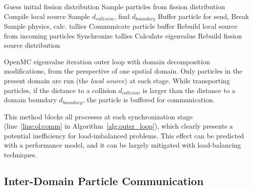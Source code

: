 \documentclass[12pt,twoside]{mitthesis-exec}
\begin{document}
\begin{algorithm}[h!]
    \begin{algorithmic}[1]
        \State Guess initial fission distribution \label{line:ol:guess}
            \State Sample particles from fission distribution
            \State Compile local source \label{line:ol:compile_src}
            \Repeat \label{line:ol:loop1}
                        \State Sample $d_{collision}$, find $d_{boundary}$
                        \label{line:ol:buff1}
                            \State Buffer particle for send, Break\label{line:ol:buff2}
                        \EndIf\label{line:ol:buff3}
                        \State Sample physics, calc. tallies
                    \EndWhile
                \EndFor
                \State Communicate particle buffer \label{line:ol:comm}
                \State Rebuild local source from incoming particles \label{line:ol:source}
             \label{line:ol:loop2}
            \State Synchronize tallies \label{line:ol:tallies}
            \State Calculate eigenvalue
            \State Rebuild fission source distribution \label{line:ol:fisssource}
        \EndFor
    \end{algorithmic}
    \caption[OpenMC eigenvalue iteration outer loop with domain
    decomposition]{OpenMC eigenvalue iteration outer loop with domain
    decomposition modifications, from the perspective of one spatial domain.
    Only particles in the present domain are run (the \emph{local source}) at
    each stage. While transporting particles, if the distance to a collision
    $d_{collision}$ is larger than the distance to a domain boundary
    $d_{boundary}$, the particle is buffered for communication.
    \label{alg:outer_loop}}
\end{algorithm}

This method blocks all processes at each synchronization stage
(line~\ref{line:ol:comm} in Algorithm~\ref{alg:outer_loop}), which clearly
presents a potential inefficiency for load-imbalanced problems. This effect can
be predicted with a performance model, and it can be largely mitigated with
load-balancing techniques.

\subsection*{Inter-Domain Particle Communication}
\end{document}
